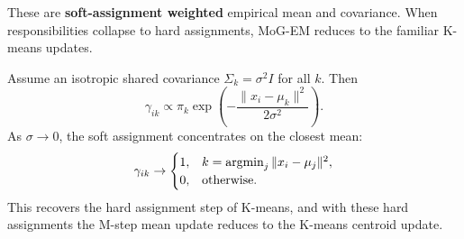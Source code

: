 \documentclass[../main]{subfiles}
\begin{document}
\begin{remark}
    These are \textbf{soft-assignment weighted} empirical mean and covariance.
    When responsibilities collapse to hard assignments, MoG-EM reduces to the
    familiar K-means updates.
\end{remark}

Assume an isotropic shared covariance $\Sigma_k=\sigma^2 I$ for all $k$. Then
\begin{equation}
    \gamma_{ik}
    \propto
    \pi_k \exp\!\left(-\frac{\|x_i-\mu_k\|^2}{2\sigma^2}\right).
\end{equation}
As $\sigma\to 0$, the soft assignment concentrates on the closest mean:
\begin{equation}
    \gamma_{ik}
    \to
    \begin{cases}
        1, & k=\mathop{\mathrm{argmin}}_j \|x_i-\mu_j\|^2,\\
        0, & \text{otherwise}.
    \end{cases}
\end{equation}
This recovers the hard assignment step of K-means, and with these hard
assignments the M-step mean update reduces to the K-means centroid update.
\end{document}
